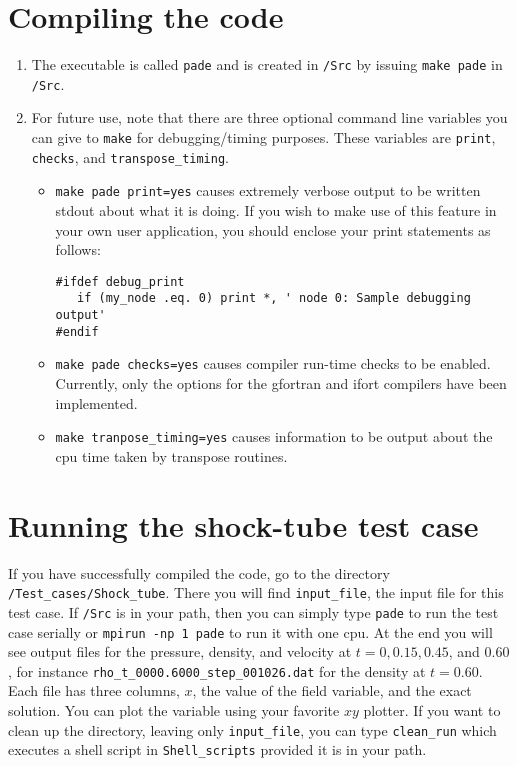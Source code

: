 \documentclass[11pt]{amsart}
\begin{document}
\section{Compiling the code}

\begin{enumerate}
\item The executable is called {\tt pade} and is created in {\tt /Src}  by issuing {\tt make pade} in {\tt /Src}.
\item For future use, note that there are three optional command line variables you can give to {\tt make} for debugging/timing purposes.  These variables are {\tt print}, {\tt checks}, and {\tt transpose\_timing}.  
\begin{itemize}
\item {\tt make pade print=yes} causes extremely verbose output to be written stdout about what it is doing.  If you wish to make use of this feature in your own user application, you should enclose your print statements as follows:
\begin{verbatim}
#ifdef debug_print
   if (my_node .eq. 0) print *, ' node 0: Sample debugging output'
#endif 
\end{verbatim}
\item {\tt make pade checks=yes} causes compiler run-time checks to be enabled.  Currently, only the options for the gfortran and ifort compilers have been implemented.
\item {\tt make tranpose\_timing=yes} causes information to be output about the cpu time taken by transpose routines.
\end{itemize}
\end{enumerate}

\section{Running the shock-tube test case}

If you have successfully compiled the code, go to the directory {\tt /Test\_cases/Shock\_tube}.  There you will find {\tt input\_file}, the input file for this test case.  If {\tt /Src} is in your path, then you can simply type {\tt pade} to run the test case serially or {\tt mpirun -np 1 pade} to run it with one cpu.  At the end you will see output files for the pressure, density, and velocity at $t = 0, 0.15, 0.45$, and $0.60$, for instance {\tt rho\_t\_0000.6000\_step\_001026.dat} for the density at $t = 0.60$.  Each file has three columns, $x$, the value of the field variable, and the exact solution.  You can plot the variable using your favorite $xy$ plotter.  If you want to clean up the directory, leaving only {\tt input\_file}, you can type {\tt clean\_run} which executes a shell script in {\tt Shell\_scripts} provided it is in your path. 
\end{document}
